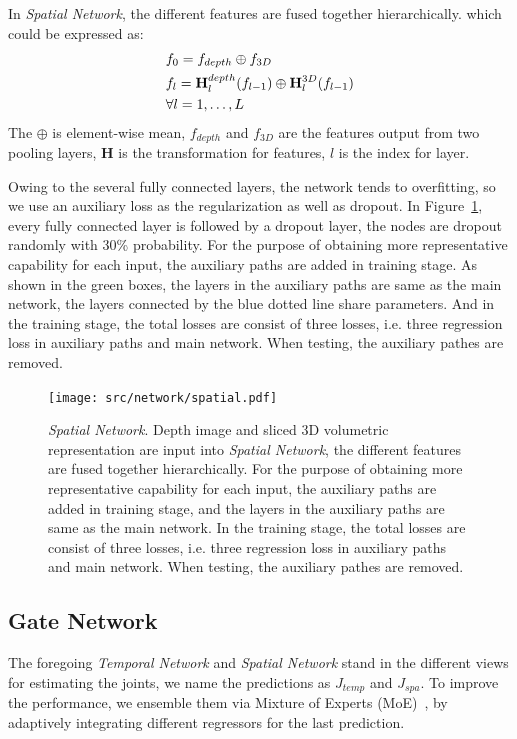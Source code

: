 \documentclass[journal,comsoc]{IEEEtran}
\let\MYoriglatexcaption\caption
\renewcommand{\caption}[2][\relax]{\MYoriglatexcaption[#2]{#2}}
\begin{document}
In \emph{Spatial Network}, the different features are fused together hierarchically.
which could be expressed as:
\begin{equation}\label{eq:deep fusion}
\begin{aligned}
&f_0 = f_{depth} \oplus f_{3D} \\
&f_l = \mathbf{H}_l^{depth}(f_{l-1}) \oplus \mathbf{H}_l^{3D}(f_{l-1}) \\
&\forall l=1, \dots , L
\vspace{1em}
\end{aligned}
\end{equation}
The $\oplus$ is element-wise mean, $f_{depth}$ and $f_{3D}$ are the features output from
two pooling layers, $\mathbf{H}$ is the transformation for features,
$l$ is the index for layer.

Owing to the several fully connected layers, the network tends to overfitting, so we use
an auxiliary loss as the regularization as well as dropout. In Figure~\ref{fig:spatial network},
every fully connected layer is followed by a dropout layer, the nodes are dropout randomly
with 30\% probability. For the purpose of obtaining more representative capability for each input,
the auxiliary paths are added in training stage. As shown in the green boxes, the layers in the
auxiliary paths are same as the main network, the layers connected by the blue dotted line
share parameters. And in the training stage, the total losses are consist of three losses,
i.e. three regression loss in auxiliary paths and main network. When testing, the auxiliary
pathes are removed.
\begin{figure}[t]
    \centering
    \texttt{[image: src/network/spatial.pdf]}
    \caption{\emph{Spatial Network}. Depth image and sliced 3D volumetric representation are input
    into \emph{Spatial Network}, the different features are fused together hierarchically. For the
    purpose of obtaining more representative capability for each input, the auxiliary paths are added
    in training stage, and the layers in the auxiliary paths are same as the main network. In the training
    stage, the total losses are consist of three losses, i.e. three regression loss in auxiliary paths
    and main network. When testing, the auxiliary pathes are removed.}
\label{fig:spatial network}
\end{figure}

\subsection{Gate Network}\label{sec:gate network}
The foregoing \emph{Temporal Network} and \emph{Spatial Network} stand in the different views
for estimating the joints, we name the predictions as $\mathit{J}_{temp}$ and $\mathit{J}_{spa}$. To improve
the performance, we ensemble them via Mixture of Experts (MoE)~\cite{jacobs1991adaptive}, by adaptively integrating
different regressors for the last prediction.
\end{document}
